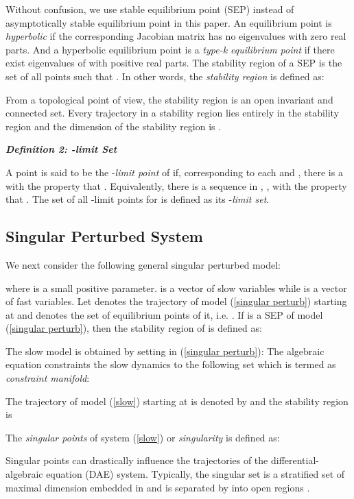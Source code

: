 \documentclass[journal]{IEEEtran}
\begin{document}
Without confusion, we use stable equilibrium point (SEP) instead of asymptotically stable equilibrium point in this paper. An equilibrium point is \textit{hyperbolic} if the corresponding Jacobian matrix has no eigenvalues with zero real parts. And a hyperbolic equilibrium point  is a \textit{type-k equilibrium point} if there exist  eigenvalues of  with positive real parts. The stability region of a SEP  is the set of all points  such that . In other words, the \textit{stability region} is defined as:


From a topological point of view, the stability region is an open invariant and connected set. Every trajectory in a stability region lies entirely in the stability region and the dimension of the stability region is .

\noindent\textit{\textbf{Definition 2: -limit Set}}

A point  is said to be the -\textit{limit point} of  if, corresponding to each  and , there is a  with the property that . Equivalently, there is a sequence  in , , with the property that . The set of all -limit points for  is defined as its -\textit{limit set}.

\subsection{Singular Perturbed System}
We next consider the following general singular perturbed model:

where  is a small positive parameter.  is a vector of slow variables while  is a vector of fast variables. Let  denotes the trajectory of model (\ref{singular perturb}) starting at  and  denotes the set of equilibrium points of it, i.e. . If  is a SEP of model (\ref{singular perturb}), then the stability region of  is defined as:

The slow model is obtained by setting  in (\ref{singular perturb}):
The algebraic equation  constraints the slow dynamics to the following set which is termed as \textit{constraint manifold}:

The trajectory of model (\ref{slow}) starting at  is denoted by  and the stability region is


The \textit{singular points} of system (\ref{slow}) or \textit{singularity } is defined as:


Singular points can drastically influence the trajectories of the differential-algebraic equation (DAE) system. Typically, the singular set  is a stratified set of maximal dimension  embedded in  and  is separated by  into open regions \cite{Veukatasubramanian:article}\cite{Alberto:article}.
\end{document}
